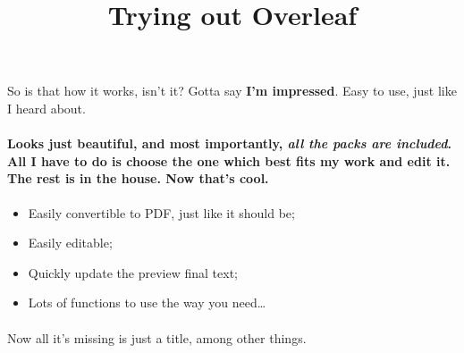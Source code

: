 \documentclass{article}
\title{Trying out Overleaf}
\begin{document}
\paragraph{} So is that how it works, isn't it? Gotta say \textbf{I'm impressed}. Easy to use, just like I heard about.
\paragraph{Looks just beautiful, and most importantly, \textit{all the packs are included}. All I have to do is choose the one which best fits my work and edit it. The rest is in the house. Now that's cool.}
\begin{itemize}
\item Easily convertible to PDF, just like it should be;
\item Easily editable;
\item Quickly update the preview final text;
\item Lots of functions to use the way you need\ldots
\end{itemize}
\paragraph{} Now all it's missing is just a title, among other things.
\end{document}
